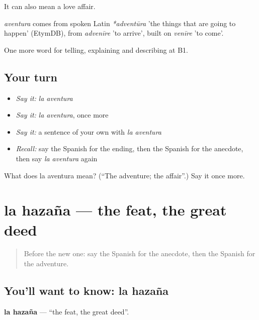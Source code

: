 It can also mean a love affair.

\begin{cousinweb}
\emph{aventura} comes from spoken Latin \emph{*adventūra} 'the things that are going to happen' (EtymDB), from \emph{advenīre} 'to arrive', built on \emph{venīre} 'to come'.
\end{cousinweb}

\begin{grammarlens}[title={What you've built}]
One more word for telling, explaining and describing at B1.
\end{grammarlens}

\subsection*{Your turn}
\begin{itemize}
\raggedright
  \item \emph{Say it:} \emph{la aventura}
  \item \emph{Say it:} \emph{la aventura}, once more
  \item \emph{Say it:} a sentence of your own with \emph{la aventura}
  \item \emph{Recall:} say the Spanish for the ending, then the Spanish for the anecdote, then say \emph{la aventura} again
\end{itemize}

\begin{tcolorbox}[breakable,colback=teal!4,colframe=teal!35!black,title={Before you move on}]
What does la aventura mean? (\textquotedblleft{}The adventure; the affair\textquotedblright{}.) Say it once more.
\end{tcolorbox}
\section[la hazaña]{la hazaña — the feat, the great deed}

\label{lesson:ES-C566-hazana}



\begin{quote}
Before the new one: say the Spanish for the anecdote, then the Spanish for the adventure.
\end{quote}

\subsection*{You'll want to know: la hazaña}
\textbf{la hazaña} — \textquotedblleft{}the feat, the great deed\textquotedblright{}.

